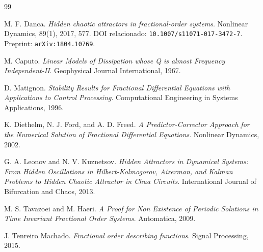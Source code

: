 \documentclass[11pt]{article}
\begin{document}
\begin{thebibliography}{99}

M. F. Danca.
\emph{Hidden chaotic attractors in fractional-order systems}.
Nonlinear Dynamics, 89(1), 2017, 577.
DOI relacionado: \texttt{10.1007/s11071-017-3472-7}.
Preprint: \texttt{arXiv:1804.10769}.

M. Caputo.
\emph{Linear Models of Dissipation whose Q is almost Frequency Independent-II}.
Geophysical Journal International, 1967.

D. Matignon.
\emph{Stability Results for Fractional Differential Equations with Applications to Control Processing}.
Computational Engineering in Systems Applications, 1996.

K. Diethelm, N. J. Ford, and A. D. Freed.
\emph{A Predictor-Corrector Approach for the Numerical Solution of Fractional Differential Equations}.
Nonlinear Dynamics, 2002.

G. A. Leonov and N. V. Kuznetsov.
\emph{Hidden Attractors in Dynamical Systems: From Hidden Oscillations in Hilbert-Kolmogorov, Aizerman, and Kalman Problems to Hidden Chaotic Attractor in Chua Circuits}.
International Journal of Bifurcation and Chaos, 2013.

M. S. Tavazoei and M. Haeri.
\emph{A Proof for Non Existence of Periodic Solutions in Time Invariant Fractional Order Systems}.
Automatica, 2009.

J. Tenreiro Machado.
\emph{Fractional order describing functions}.
Signal Processing, 2015.

\end{thebibliography}
\end{document}
